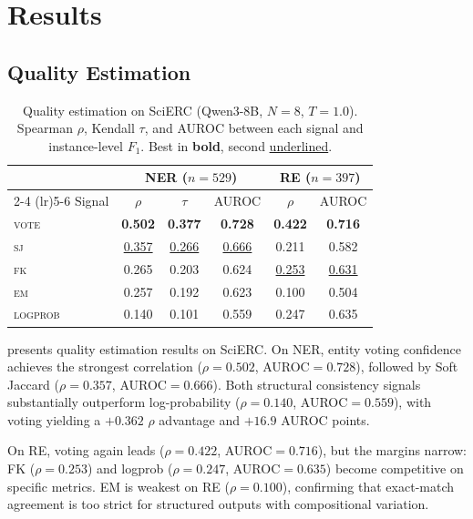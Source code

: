 \documentclass[11pt]{article}
\begin{document}
\section{Results}

\subsection{Quality Estimation}
\label{sec:results-qe}

\begin{table}[t]
\centering
\caption{Quality estimation on SciERC (Qwen3-8B, $N{=}8$, $T{=}1.0$). Spearman $\rho$, Kendall $\tau$, and AUROC between each signal and instance-level $F_1$. Best in \textbf{bold}, second \underline{underlined}.}
\label{tab:qe-scierc}
\small
\begin{tabular}{l ccc cc}
\toprule
& \multicolumn{3}{c}{\textbf{NER} ($n{=}529$)} & \multicolumn{2}{c}{\textbf{RE} ($n{=}397$)} \\
\cmidrule(lr){2-4} \cmidrule(lr){5-6}
Signal & $\rho$ & $\tau$ & AUROC & $\rho$ & AUROC \\
\midrule
\textsc{vote}   & \textbf{0.502} & \textbf{0.377} & \textbf{0.728} & \textbf{0.422} & \textbf{0.716} \\
\textsc{sj}     & \underline{0.357} & \underline{0.266} & \underline{0.666} & 0.211 & 0.582 \\
\textsc{fk}     & 0.265 & 0.203 & 0.624 & \underline{0.253} & \underline{0.631} \\
\textsc{em}     & 0.257 & 0.192 & 0.623 & 0.100 & 0.504 \\
\textsc{logprob}& 0.140 & 0.101 & 0.559 & 0.247 & 0.635 \\
\bottomrule
\end{tabular}
\end{table}

 presents quality estimation results on SciERC.
On NER, entity voting confidence achieves the strongest correlation ($\rho{=}0.502$, AUROC${=}0.728$), followed by Soft Jaccard ($\rho{=}0.357$, AUROC${=}0.666$).
Both structural consistency signals substantially outperform log-probability ($\rho{=}0.140$, AUROC${=}0.559$), with voting yielding a $+0.362$ $\rho$ advantage and $+16.9$ AUROC points.

On RE, voting again leads ($\rho{=}0.422$, AUROC${=}0.716$), but the margins narrow: FK ($\rho{=}0.253$) and logprob ($\rho{=}0.247$, AUROC${=}0.635$) become competitive on specific metrics.
EM is weakest on RE ($\rho{=}0.100$), confirming that exact-match agreement is too strict for structured outputs with compositional variation.
\end{document}
